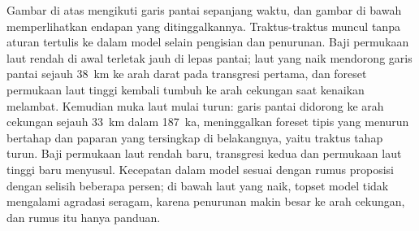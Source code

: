 Gambar di atas mengikuti garis pantai sepanjang waktu, dan gambar di bawah
memperlihatkan endapan yang ditinggalkannya. Traktus-traktus muncul tanpa aturan tertulis ke dalam
model selain pengisian dan penurunan. Baji permukaan laut rendah di awal terletak
jauh di lepas pantai; laut yang naik mendorong garis pantai sejauh \qty{38}{km} ke arah darat pada
transgresi pertama, dan foreset permukaan laut tinggi kembali tumbuh ke arah cekungan saat kenaikan melambat.
Kemudian muka laut mulai turun: garis pantai didorong ke arah cekungan sejauh \qty{33}{km} dalam
\qty{187}{ka}, meninggalkan foreset tipis yang menurun bertahap dan paparan yang tersingkap
di belakangnya, yaitu traktus tahap turun. Baji permukaan laut rendah baru, transgresi kedua
dan permukaan laut tinggi baru menyusul. Kecepatan  dalam model
sesuai dengan rumus proposisi dengan selisih beberapa persen;
di bawah laut yang naik, topset model tidak mengalami agradasi seragam, karena penurunan
makin besar ke arah cekungan, dan rumus itu hanya panduan.

